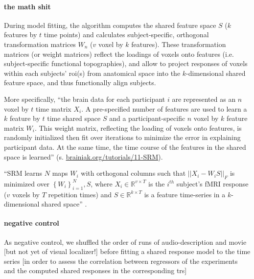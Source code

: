 \paragraph{the math shit}


%
During model fitting, the algorithm computes the shared feature space $S$ ($k$
features by $t$ time points) and calculates subject-specific, orthogonal
transformation matrices $W_{n}$ ($v$ voxel by $k$ features).
%
These transformation matrices (or weight matrices) reflect the loadings of
voxels onto features (i.e. subject-specific functional topographies), and allow
to project responses of voxels within each subjects' \ac{roi}(s) from anatomical
space into the $k$-dimensional shared feature space, and thus functionally align
subjects.


%
More specifically, ``the brain data for each participant $i$ are represented as
an \textbf{$n$} voxel by $t$ time matrix  $X_{i}$. A pre-specified number of
features are used to learn a $k$ feature by  $t$ time shared space $S$ and a
participant-specific $n$ voxel by $k$  feature matrix $W_{i}$. This weight
matrix, reflecting the loading of voxels onto features, is randomly initialized
then fit over iterations to minimize the error in explaining participant data.
At the same time, the time course of the features in the shared space is
learned'' (s.
\href{https://brainiak.org/tutorials/11-SRM/}{brainiak.org/tutorials/11-SRM}).

%
``SRM learns $N$ maps $W_{i}$ with orthogonal columns such that
$||X_{i}-W_{i}S||_{F}$ is minimized over $\left\{ W_{i}\right\} _{i=1}^{N},S$,
where $X_{i}\in\mathbb{R}^{v\times{T}}$ is the $i^{th}$ subject's fMRI response
($v$ voxels by $T$ repetition times) and $S\in\mathbb{R}^{k\times{T}}$ is a
feature time-series in a $k$-dimensional shared space''
\citep{vodrahalli2018mapping}.


\paragraph{negative control}



As negative control, we shuffled the order of runs of audio-description and
movie [but not yet of visual localizer!] before fitting a shared response model
to the time series [in order to assess the correlation between regressors of the
experiments and the computed shared responses in the corresponding \acp{tr}]


